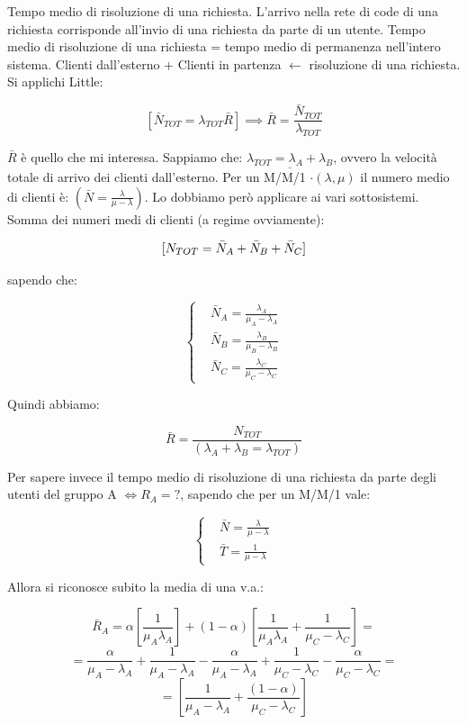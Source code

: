 Tempo medio di risoluzione di una richiesta. L'arrivo nella rete di code di una richiesta corrisponde all'invio di una richiesta da parte di un utente. Tempo medio di risoluzione di una richiesta = tempo medio di permanenza nell'intero sistema. Clienti dall'esterno + Clienti in partenza $\leftarrow$ risoluzione di una richiesta. Si applichi Little:

\[
	[\bar{N}_{TOT} = \lambda_{TOT}\bar{R}] \implies \bar{R} = \frac{\bar{N}_{TOT}}{\lambda_{TOT}}
\]

$\bar{R}$ è quello che mi interessa. Sappiamo che: $\underline{\lambda_{TOT} = \lambda_A+\lambda_B}$, ovvero la velocità totale di arrivo dei clienti dall'esterno. Per un M/M/1 $\mathord{\cdot}(\lambda,\mu)$ il numero medio di clienti è: $(\bar{N}=\frac{\lambda}{\mu-\lambda})$. Lo dobbiamo però applicare ai vari sottosistemi. Somma dei numeri medi di clienti (a regime ovviamente):

\[
	[N_{TOT}=\bar{N}_A+\bar{N}_B+\bar{N}_C]\\
\]

sapendo che:

\[
	\left\{
	\begin{aligned}
	&\bar{N}_A = \frac{\lambda_A}{\mu_A-\lambda_A}\\
	&\bar{N}_B = \frac{\lambda_B}{\mu_B-\lambda_B}\\
	&\bar{N}_C = \frac{\lambda_C}{\mu_C-\lambda_C}
	\end{aligned}
	\right.
\]

Quindi abbiamo:

\[
	\bar{R} = \frac{N_{TOT}}{(\lambda_A+\lambda_B=\lambda_{TOT})}
\]

Per sapere invece il tempo medio di risoluzione di una richiesta da parte degli utenti del gruppo A $\iff R_A=?$, sapendo che per un M/M/1 vale:

\[
	\left\{
	\begin{aligned}
	&\bar{N}=\frac{\lambda}{\mu-\lambda}\\
	&\bar{T}=\frac{1}{\mu-\lambda}
	\end{aligned}
	\right.
\]

Allora si riconosce subito la media di una v.a.:

\[
	\bar{R}_A = \alpha[\frac{1}{\mu_A\lambda_A}] + (1-\alpha)[\frac{1}{\mu_A\lambda_A} + \frac{1}{\mu_C-\lambda_C}] =
\]
\[
	=  \frac{\alpha}{\mu_A-\lambda_A}+\frac{1}{\mu_A-\lambda_A}-\frac{\alpha}{\mu_A-\lambda_A}+\frac{1}{\mu_C-\lambda_C}-\frac{\alpha}{\mu_C-\lambda_C} =
\]
\[
	= [\frac{1}{\mu_A-\lambda_A}+\frac{(1-\alpha)}{\mu_C-\lambda_C}]
\]

